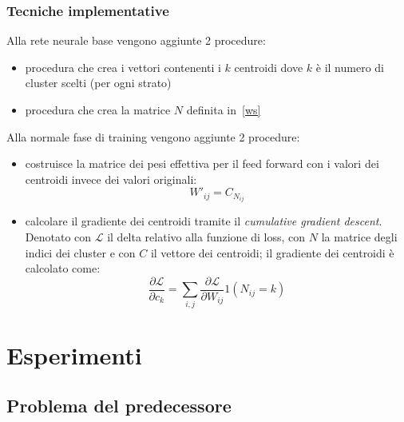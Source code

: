 \documentclass[11pt,a4paper,twoside,
openright]{book}
\begin{document}
\subsection{Tecniche implementative}
Alla rete neurale base vengono aggiunte 2 procedure:
\begin{itemize}
\item procedura che crea i vettori contenenti i $k$ centroidi dove $k$ è il numero di cluster scelti (per ogni strato)
\item procedura che crea la matrice $N$ definita in~\eqref{ws}
\end{itemize}
Alla normale fase di training vengono aggiunte 2 procedure:
\begin{itemize}
\item costruisce la matrice dei pesi effettiva per il feed forward con i valori dei centroidi invece dei valori originali:
\begin{equation}
W'_{ij} = C_{N_{ij}}
\label{wprimo}
\end{equation}
\item calcolare il gradiente dei centroidi tramite il \textit{cumulative gradient descent}. Denotato con $\mathcal{L}$ il delta relativo alla funzione di loss, con $N$ la matrice degli indici dei cluster e con $C$ il vettore dei centroidi; il gradiente dei centroidi è calcolato come:
\begin{equation}
\frac{\partial \mathcal{L}}{\partial c_{k}}=\sum\limits_{i,j}\frac{\partial \mathcal{L}}{\partial W_{ij}}1(N_{ij}=k)
\label{gradientews}
\end{equation}


\end{itemize}


\chapter{Esperimenti}
\section{Problema del predecessore}

{}

\end{document}

